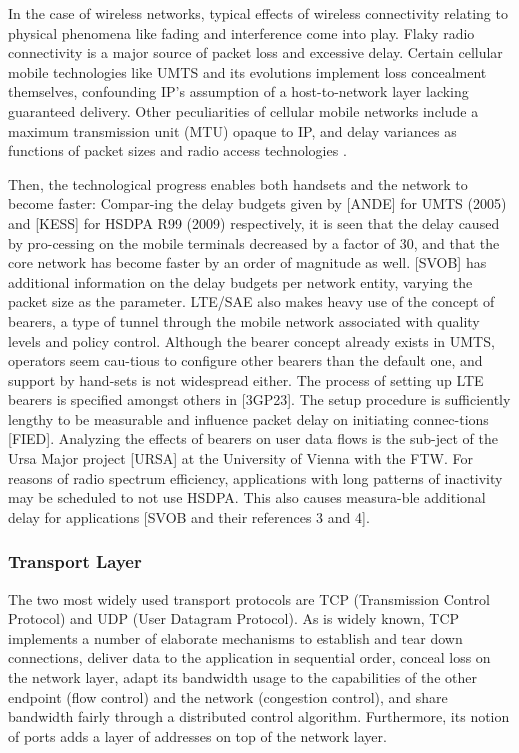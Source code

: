 In the case of wireless networks, typical effects of wireless connectivity relating to physical phenomena like fading and interference come into play. Flaky radio connectivity is a major source of packet loss and excessive delay. Certain cellular mobile technologies like UMTS and its evolutions implement loss concealment themselves, confounding IP's assumption of a host-to-network layer lacking guaranteed delivery. Other peculiarities of cellular mobile networks include a maximum transmission unit (MTU) opaque to IP, and delay variances as functions of packet sizes \cite{Arlos10} and radio access technologies \cite{laner2011dissecting}.


 Then, the technological progress enables both handsets and the network to become faster: Compar-ing the delay budgets given by [ANDE] for UMTS (2005) and [KESS] for HSDPA R99 (2009) respectively, it is seen that the delay caused by pro-cessing on the mobile terminals decreased by a factor of 30, and that the core network has become faster by an order of magnitude as well. [SVOB] has additional information on the delay budgets per network entity, varying the packet size as the parameter.
LTE/SAE also makes heavy use of the concept of bearers, a type of tunnel through the mobile network associated with quality levels and policy control. Although the bearer concept already exists in UMTS, operators seem cau-tious to configure other bearers than the default one, and support by hand-sets is not widespread either. The process of setting up LTE bearers is specified amongst others in [3GP23]. The setup procedure is sufficiently lengthy to be measurable and influence packet delay on initiating connec-tions [FIED]. Analyzing the effects of bearers on user data flows is the sub-ject of the Ursa Major project [URSA] at the University of Vienna with the FTW.
%
For reasons of radio spectrum efficiency, applications with long patterns of inactivity may be scheduled to not use HSDPA. This also causes measura-ble additional delay for applications [SVOB and their references 3 and 4].
%


\subsubsection{Transport Layer}


The two most widely used transport protocols are TCP (Transmission Control Protocol) and UDP (User Datagram Protocol). As is widely known, TCP implements a number of elaborate mechanisms to establish and tear down connections, deliver data to the application in sequential order, conceal loss on the network layer, adapt its bandwidth usage to the capabilities of the other endpoint (flow control) and the network (congestion control), and share bandwidth fairly through a distributed control algorithm. Furthermore, its notion of ports adds a layer of addresses on top of the network layer.

